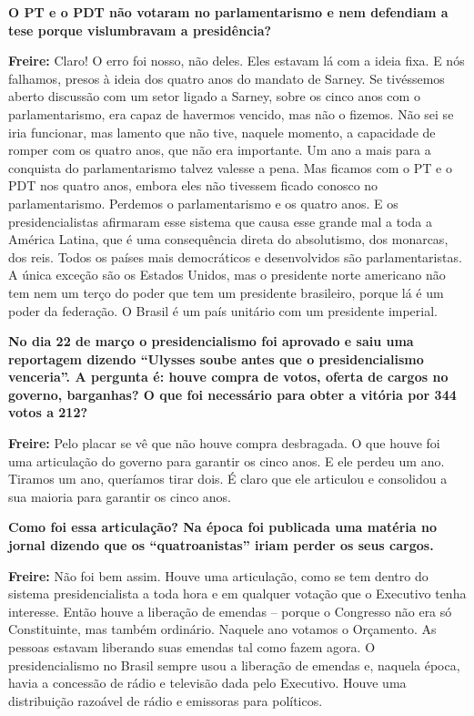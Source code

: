\textbf{O PT e o PDT não votaram no parlamentarismo e nem defendiam a
tese porque vislumbravam a presidência?}

\textbf{Freire:} Claro! O erro foi nosso, não deles. Eles estavam lá com
a ideia fixa. E nós falhamos, presos à ideia dos quatro anos do mandato
de Sarney. Se tivéssemos aberto discussão com um setor ligado a Sarney,
sobre os cinco anos com o parlamentarismo, era capaz de havermos
vencido, mas não o fizemos. Não sei se iria funcionar, mas lamento que
não tive, naquele momento, a capacidade de romper com os quatro anos,
que não era importante. Um ano a mais para a conquista do
parlamentarismo talvez valesse a pena. Mas ficamos com o PT e o PDT nos
quatro anos, embora eles não tivessem ficado conosco no parlamentarismo.
Perdemos o parlamentarismo e os quatro anos. E os presidencialistas
afirmaram esse sistema que causa esse grande mal a toda a América
Latina, que é uma consequência direta do absolutismo, dos monarcas, dos
reis. Todos os países mais democráticos e desenvolvidos são
parlamentaristas. A única exceção são os Estados Unidos, mas o
presidente norte americano não tem nem um terço do poder que tem um
presidente brasileiro, porque lá é um poder da federação. O Brasil é um
país unitário com um presidente imperial.

\textbf{No dia 22 de março o presidencialismo foi aprovado e saiu uma
reportagem dizendo ``Ulysses soube antes que o presidencialismo
venceria''. A pergunta é: houve compra de votos, oferta de cargos no
governo, barganhas? O que foi necessário para obter a vitória por 344
votos a 212?}

\textbf{Freire:} Pelo placar se vê que não houve compra desbragada. O
que houve foi uma articulação do governo para garantir os cinco anos. E
ele perdeu um ano. Tiramos um ano, queríamos tirar dois. É claro que ele
articulou e consolidou a sua maioria para garantir os cinco anos.

\textbf{Como foi essa articulação? Na época foi publicada uma matéria no
jornal dizendo que os ``quatroanistas'' iriam perder os seus cargos.}

\textbf{Freire:} Não foi bem assim. Houve uma articulação, como se tem
dentro do sistema presidencialista a toda hora e em qualquer votação que
o Executivo tenha interesse. Então houve a liberação de emendas --
porque o Congresso não era só Constituinte, mas também ordinário.
Naquele ano votamos o Orçamento. As pessoas estavam liberando suas
emendas tal como fazem agora. O presidencialismo no Brasil sempre usou a
liberação de emendas e, naquela época, havia a concessão de rádio e
televisão dada pelo Executivo. Houve uma distribuição razoável de rádio
e emissoras para políticos.

